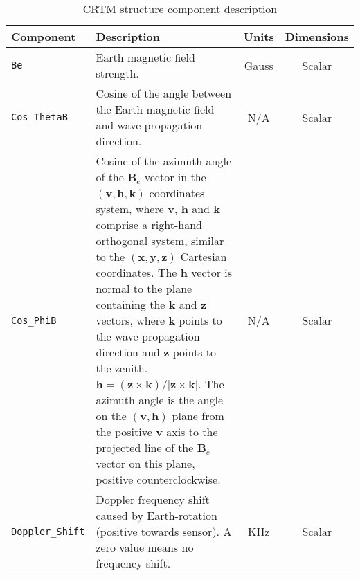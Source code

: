 \begin{table}[htp]
  \centering
  \begin{tabular}{l p{7cm} c c}
    \hline
    \sffamily\textbf{Component} & \sffamily\textbf{Description} & \sffamily\textbf{Units} & \sffamily\textbf{Dimensions} \\
    \hline\hline
    \texttt{Be}           & Earth magnetic field strength. & Gauss & Scalar \\
    \texttt{Cos\_ThetaB}  & Cosine of the angle between the Earth magnetic field and wave propagation direction. & N/A & Scalar \\
    \texttt{Cos\_PhiB}    & Cosine of the azimuth angle of the $\mathbf{B}_e$ vector in the $(\mathbf{v}, \mathbf{h}, \mathbf{k})$ coordinates system, where $\mathbf{v}$, $\mathbf{h}$ and $\mathbf{k}$ comprise a right-hand orthogonal system, similar to the $(\mathbf{x}, \mathbf{y}, \mathbf{z})$ Cartesian coordinates. The $\mathbf{h}$ vector is normal to the plane containing the $\mathbf{k}$ and $\mathbf{z}$ vectors, where $\mathbf{k}$ points to the wave propagation direction and $\mathbf{z}$ points to the zenith. $\mathbf{h} = (\mathbf{z} \times \mathbf{k})/|\mathbf{z} \times \mathbf{k}|$. The azimuth angle is the angle on the $(\mathbf{v}, \mathbf{h})$ plane from the positive $\mathbf{v}$ axis to the projected line of the $\mathbf{B}_e$ vector on this plane, positive counterclockwise. & N/A & Scalar \\
    \texttt{Doppler\_Shift}  & Doppler frequency shift caused by Earth-rotation (positive towards sensor). A zero value means no frequency shift. & KHz & Scalar \\
    \hline
  \end{tabular}
  \caption{CRTM \ZeemanInput{} structure component description}
  \label{tab:zeeman_input_structure}
\end{table}






